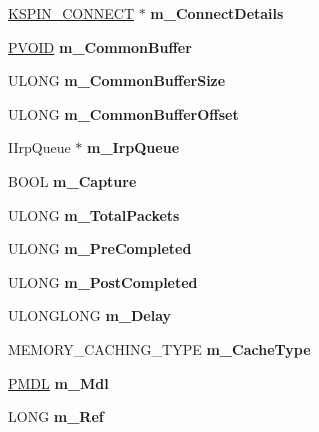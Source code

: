 \begin{DoxyCompactItemize}
\hyperlink{struct_k_s_p_i_n___c_o_n_n_e_c_t}{K\+S\+P\+I\+N\+\_\+\+C\+O\+N\+N\+E\+CT} $\ast$ {\bfseries m\+\_\+\+Connect\+Details}
\item 
\mbox{\label{class_c_port_pin_wave_r_t_a0e721e1f5570dccc80b8bc7c5788aba8}} 
\hyperlink{interfacevoid}{P\+V\+O\+ID} {\bfseries m\+\_\+\+Common\+Buffer}
\item 
\mbox{\label{class_c_port_pin_wave_r_t_a1f74832bb68afd8c10cf851a2cf41041}} 
U\+L\+O\+NG {\bfseries m\+\_\+\+Common\+Buffer\+Size}
\item 
\mbox{\label{class_c_port_pin_wave_r_t_aa8ccef6b745a4219f9cf43c218cd3277}} 
U\+L\+O\+NG {\bfseries m\+\_\+\+Common\+Buffer\+Offset}
\item 
\mbox{\label{class_c_port_pin_wave_r_t_aa598794027a0b00eaa172a232846db12}} 
I\+Irp\+Queue $\ast$ {\bfseries m\+\_\+\+Irp\+Queue}
\item 
\mbox{\label{class_c_port_pin_wave_r_t_ad65f730e19c8187dfe7c25851cd4c94f}} 
B\+O\+OL {\bfseries m\+\_\+\+Capture}
\item 
\mbox{\label{class_c_port_pin_wave_r_t_a1a9697527c5c8cfe189f4efdf0eeb0b7}} 
U\+L\+O\+NG {\bfseries m\+\_\+\+Total\+Packets}
\item 
\mbox{\label{class_c_port_pin_wave_r_t_a6215e3985fb2b77e95779c664a747ee7}} 
U\+L\+O\+NG {\bfseries m\+\_\+\+Pre\+Completed}
\item 
\mbox{\label{class_c_port_pin_wave_r_t_a0f4b90b3dda913b418d3a520522024cf}} 
U\+L\+O\+NG {\bfseries m\+\_\+\+Post\+Completed}
\item 
\mbox{\label{class_c_port_pin_wave_r_t_a775e5fb1f30fdd3f6deccc53b2c1f5cb}} 
U\+L\+O\+N\+G\+L\+O\+NG {\bfseries m\+\_\+\+Delay}
\item 
\mbox{\label{class_c_port_pin_wave_r_t_aaf86a60870a2db24a917818dec38d6c8}} 
M\+E\+M\+O\+R\+Y\+\_\+\+C\+A\+C\+H\+I\+N\+G\+\_\+\+T\+Y\+PE {\bfseries m\+\_\+\+Cache\+Type}
\item 
\mbox{\label{class_c_port_pin_wave_r_t_a935d2f71136dcae0cbab6b5b468d9124}} 
\hyperlink{interfacevoid}{P\+M\+DL} {\bfseries m\+\_\+\+Mdl}
\item 
\mbox{\label{class_c_port_pin_wave_r_t_a916bbc5dbbf5ecaaf7bed1de95eb6c4c}} 
L\+O\+NG {\bfseries m\+\_\+\+Ref}
\end{DoxyCompactItemize}

